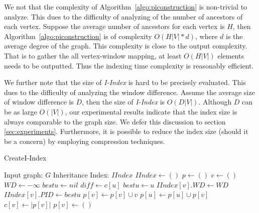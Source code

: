 We not that the complexity of Algorithm~\ref{algo:piconstruction} is non-trivial to analyze. 
This dues to the difficulty of analyzing of the number of ancestors of each vertex. Suppose the 
average number of ancestors for each vertex is $H$, then Algorithm~\ref{algo:piconstruction} is of
complexity $O(H|V|*d)$, where $d$ is the average degree of the graph. This complexity is close to the
output complexity. That is to gather the all vertex-window mapping, at least $O(H|V|)$ elements needs
to be outputted. Thus the indexing time complexity is reasonably efficient.

We further note that the size of \emph{I-Index} is hard to be precisely evaluated. 
This dues to the difficulty of analyzing the window difference. Assume the average size of window difference
is $D$, then the size of \emph{I-Index} is $O(D|V|)$. Although $D$ can be as large $O(|V|)$, our 
experimental results indicate that the index size is always 
comparable to the graph size. We defer this discussion to 
section \ref{sec:experiments}. Furthermore, it is possible to
reduce the index size (should it be a concern) by employing
compression techniques. 

\begin{algorithm}[h]
\label{alg:piconstruction}
\caption{CreateI-Index}
\begin{algorithmic}[1]
\Require Input graph: $G$ 
\Ensure Inheritance Index: $IIndex$ 
\State $IIndex \leftarrow ()$
\State $p \leftarrow ()$ 
\State $c \leftarrow ()$ 
\State $WD \leftarrow -\infty$ 
\State $bestu \leftarrow nil$
 \label{algo:tp-step1-start}
		\State $diff \leftarrow c[u]$
		\State $bestu \leftarrow u$
	\EndIf
\EndFor \label{algo:tp-step1-stop}
\State $IIndex[v].WD \leftarrow WD$
\State $IIndex[v].PID \leftarrow bestu$
\State $p[v] \leftarrow p[v] \cup v$
 \label{algo:tp-step2-start}
	\State $p[u] \leftarrow p[u] \cup p[v]$
\EndFor \label{algo:tp-step2-stop}
\State $c[v] \leftarrow |p[v]|$ 
\State $p[v] \leftarrow ()$ 
\EndFor
\end{algorithmic}
\label{algo:piconstruction}
\end{algorithm}



